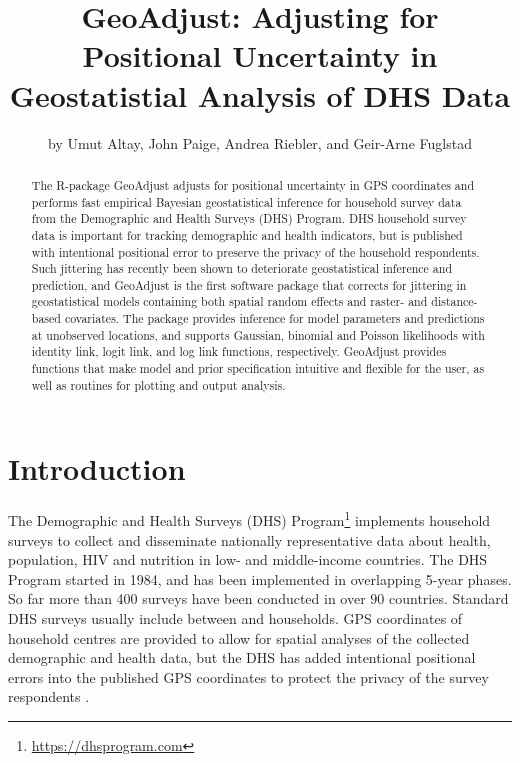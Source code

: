 \title{GeoAdjust: Adjusting for Positional Uncertainty in Geostatistial Analysis of DHS Data}
\author{by Umut Altay, John Paige, Andrea Riebler, and Geir-Arne Fuglstad}

\maketitle

\begin{abstract}
The R-package GeoAdjust adjusts for positional uncertainty in GPS coordinates and performs fast empirical Bayesian geostatistical inference for household survey data from the  Demographic and Health Surveys (DHS) Program. DHS household survey data is important for tracking demographic and health indicators, but is published with intentional positional error to preserve the privacy of the household respondents. Such jittering has recently been shown to deteriorate geostatistical inference and prediction, and  GeoAdjust is the first software package that corrects for jittering in geostatistical models containing both spatial random effects and raster- and distance-based covariates. The package provides inference for model parameters and predictions at unobserved locations, and supports Gaussian, binomial and Poisson likelihoods with identity link, logit link, and log link functions, respectively. GeoAdjust provides functions that make model and prior specification intuitive and flexible for the user, as well as routines for plotting and output analysis.
\end{abstract}

\section{Introduction}

The Demographic and Health Surveys (DHS) Program\footnote{\url{https://dhsprogram.com}} implements household surveys to collect and disseminate nationally representative data about health, population, HIV and nutrition in low- and middle-income countries. The DHS Program started in 1984, and has been implemented in overlapping 5-year phases. So far more than 400 surveys have been conducted in over $90$ countries. Standard DHS surveys usually include between  and  households. GPS coordinates of household centres are provided to allow for spatial analyses of the collected demographic and health data, but the DHS has added intentional positional errors into the published GPS coordinates to protect the privacy of the survey respondents \citep{DHSspatial07}.

